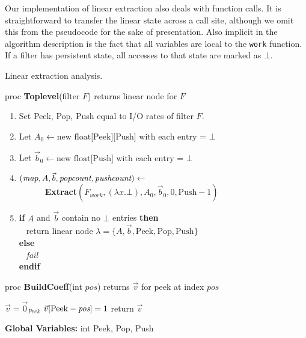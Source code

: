 Our implementation of linear extraction also deals with function
calls.  It is straightforward to transfer the linear state across a
call site, although we omit this from the pseudocode for the sake of
presentation.  Also implicit in the algorithm description is the fact
that all variables are local to the {\tt work} function.  If a filter
has persistent state, all accesses to that state are marked as $\bot$.

\begin{algorithm}[t]
\caption{Linear extraction analysis.\protect\label{alg:dataflow}}
proc {\bf Toplevel}(filter $F$) returns linear node for $F$
\begin{enumerate}
\item Set Peek, Pop, Push equal to I/O rates of filter $F$.
\item Let $A_{0} \leftarrow \mbox{new float[Peek][Push] with each entry =~} \bot$
\item Let ${\vec b_{0}} \leftarrow \mbox{new float[Push] with each entry =~} \bot$
\item $(\mbox{\it map}, A, {\vec b}, \mbox{\it popcount}, \mbox{\it pushcount}) \leftarrow$ \\
\verb+      +{\bf Extract}$(F_{work}, (\lambda x . \bot), A_{0}, {\vec b_{0}}, 0, \mbox{Push}-1)$
\item {\bf if} $A$ and ${\vec b}$ contain no $\bot$ entries {\bf then} \\
\verb+ + return linear node $\lambda = \{A, {\vec b}, \mbox{Peek}, \mbox{Pop}, \mbox{Push}\}$ \\
 {\bf else} \\
\verb+ + {\it fail} \\
 {\bf endif}
\end{enumerate}
proc {\bf BuildCoeff}(int $pos$) returns $\vec v$ for peek at index $pos$ \\ \vspace{-12pt}
\begin{algorithmic}
\STATE $\vec v = \vec 0_{Peek}$
\STATE $\vec v[\mbox{Peek}-\mbox{\it pos}] = 1$
\STATE return $\vec v$
\end{algorithmic}
\vspace{6pt}
{\bf Global Variables:} int Peek, Pop, Push
\end{algorithm}

